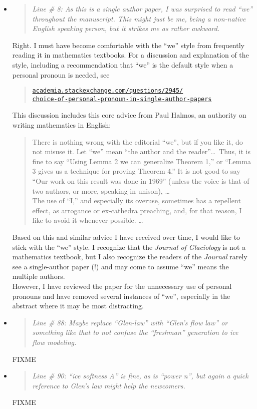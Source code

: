 \documentclass[11pt,reqno]{amsart}
\newcommand{\reply}[2]{
\medskip\medskip
\item  \begin{quote}
\emph{#1}
\end{quote}

\medskip
\noindent #2}
\begin{document}
\begin{itemize}
\reply{Line \# 8: As this is a single author paper, I was surprised to read ``we'' throughout the manuscript. This might just be me, being a non-native English speaking person, but it strikes me as rather awkward.}
{Right.  I must have become comfortable with the ``we'' style from frequently reading it in mathematics textbooks.  For a discussion and explanation of the style, including a recommendation that ``we'' is the default style when a personal pronoun is needed, see\begin{quote}
\href{http://academia.stackexchange.com/questions/2945/choice-of-personal-pronoun-in-single-author-papers}{\texttt{academia.stackexchange.com/questions/2945/\\ \phantom{foobar} choice-of-personal-pronoun-in-single-author-papers}}
\end{quote}
This discussion includes this core advice from Paul Halmos, an authority on writing mathematics in English: \begin{quote} \medskip
There is nothing wrong with the editorial ``we'', but if you like it, do not misuse it.  Let ``we'' mean ``the author and the reader''\dots  \, Thus, it is fine to say ``Using Lemma 2 we can generalize Theorem 1,'' or ``Lemma 3 gives us a technique for proving Theorem 4.''  It is not good to say ``Our work on this result was done in 1969'' (unless the voice is that of two authors, or more, speaking in unison), \dots \medskip \\
\indent The use of ``I,'' and especially its overuse, sometimes has a repellent effect, as arrogance or ex-cathedra preaching, and, for that reason, I like to avoid it whenever possible. \dots \medskip
\end{quote}
Based on this and similar advice I have received over time, I would like to stick with the ``we'' style.  I recognize that the \emph{Journal of Glaciology} is not a mathematics textbook, but I also recognize the readers of the \emph{Journal} rarely see a single-author paper (!) and may come to assume ``we'' means the multiple authors. \medskip \\
\indent However, I have reviewed the paper for the unnecessary use of personal pronouns and have removed several instances of ``we'', especially in the abstract where it may be most distracting.}

\reply{Line \# 88: Maybe replace ``Glen-law'' with ``Glen's flow law'' or something like that to not confuse the ``freshman'' generation to ice flow modeling.}
{FIXME}

\reply{Line \# 90: ``ice softness A'' is fine, as is ``power n'', but again a quick reference to Glen's law might help the newcomers.}
{FIXME}


\end{itemize}
\end{document}
